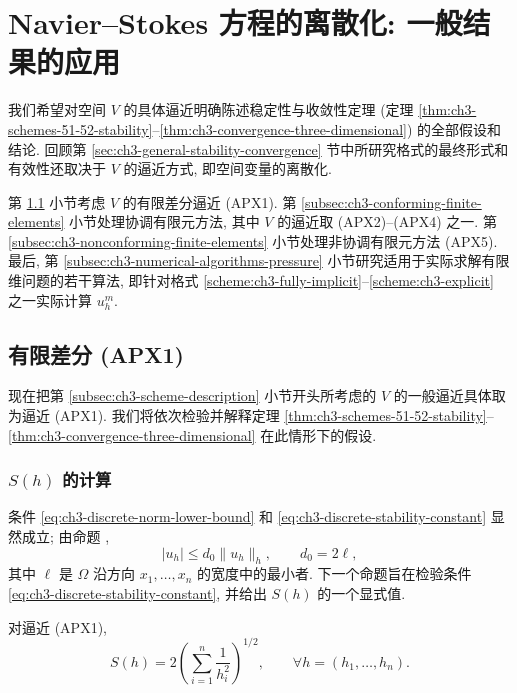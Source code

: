 \hypertarget{chapter-03-page-261-section-06}{}
\section{Navier--Stokes 方程的离散化: 一般结果的应用}
\label{sec:ch3-discretization-applications}

我们希望对空间 $V$ 的具体逼近明确陈述稳定性与收敛性定理 (定理 \ref{thm:ch3-schemes-51-52-stability}--\ref{thm:ch3-convergence-three-dimensional}) 的全部假设和结论. 回顾第 \ref{sec:ch3-general-stability-convergence} 节中所研究格式的最终形式和有效性还取决于 $V$ 的逼近方式, 即空间变量的离散化.

第 \ref{subsec:ch3-finite-differences-apx1} 小节考虑 $V$ 的有限差分逼近 (APX1). 第 \ref{subsec:ch3-conforming-finite-elements} 小节处理协调有限元方法, 其中 $V$ 的逼近取 (APX2)--(APX4) 之一. 第 \ref{subsec:ch3-nonconforming-finite-elements} 小节处理非协调有限元方法 (APX5). 最后, 第 \ref{subsec:ch3-numerical-algorithms-pressure} 小节研究适用于实际求解有限维问题的若干算法, 即针对格式 \ref{scheme:ch3-fully-implicit}--\ref{scheme:ch3-explicit} 之一实际计算 $u_h^m$.

\hypertarget{chapter-03-page-262}{}
\subsection{有限差分 (APX1)}
\label{subsec:ch3-finite-differences-apx1}

现在把第 \ref{subsec:ch3-scheme-description} 小节开头所考虑的 $V$ 的一般逼近具体取为逼近 (APX1). 我们将依次检验并解释定理 \ref{thm:ch3-schemes-51-52-stability}--\ref{thm:ch3-convergence-three-dimensional} 在此情形下的假设.

\subsubsection{$S(h)$ 的计算}
条件 \eqref{eq:ch3-discrete-norm-lower-bound} 和 \eqref{eq:ch3-discrete-stability-constant} 显然成立; 由命题 ,
\begin{equation}
|u_h|\leq d_0\lVert u_h\rVert_h,\qquad d_0=2\ell,
\label{eq:ch3-apx1-l2-bound}
\end{equation}
其中 $\ell$ 是 $\Omega$ 沿方向 $x_1,\ldots,x_n$ 的宽度中的最小者. 下一个命题旨在检验条件 \eqref{eq:ch3-discrete-stability-constant}, 并给出 $S(h)$ 的一个显式值.

\begin{Proposition}
\label{prop:ch3-apx1-stability-constant}
对逼近 (APX1),
\begin{equation}
S(h)=2\left(\sum_{i=1}^n\frac1{h_i^2}\right)^{1/2},
\qquad \forall h=(h_1,\ldots,h_n).
\label{eq:ch3-apx1-stability-constant}
\end{equation}
\end{Proposition}

